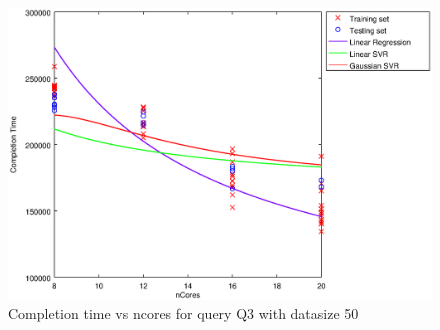 
\begin {figure}[hbtp]
\centering
\includegraphics[width=\textwidth]{output/Q3_50_ALL_WITH_1_OVER_NCORES/plot_Q3_50_bestmodels.eps}
\caption{Completion time vs ncores for query Q3 with datasize 50}
\label{fig:all_linear_Q3_50}
\end {figure}
